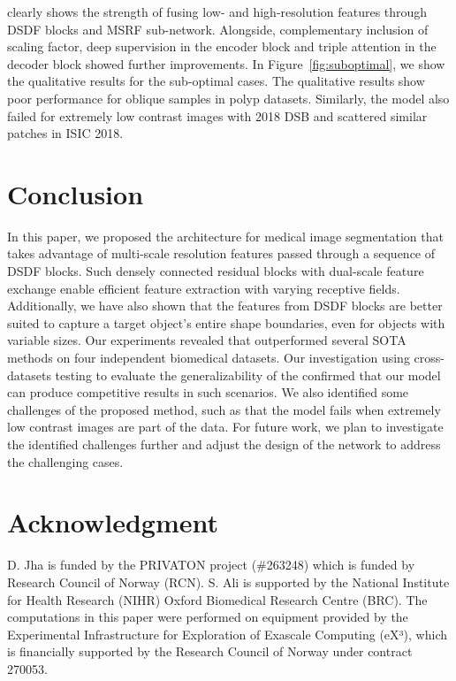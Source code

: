\documentclass[journal,twoside,web]{IEEEtran}
\newcommand{\sysname}{\text{MSRF-Net}\xspace}
\begin{document}
 \sysname clearly shows the strength of fusing low- and high-resolution features through DSDF blocks and MSRF sub-network. Alongside, complementary inclusion of scaling factor, deep supervision in the encoder block and triple attention in the decoder block showed further improvements. In Figure~\ref{fig:suboptimal}, we show the qualitative results for the sub-optimal cases. The qualitative results show poor performance for oblique samples in polyp datasets. Similarly, the model also failed for extremely low contrast images with 2018 DSB and scattered similar patches in ISIC 2018. 

\vspace{-3mm}

\section{Conclusion}

In this paper, we proposed the \sysname architecture for medical image segmentation that takes advantage of multi-scale resolution features passed through a sequence of \ac{DSDF} blocks. Such densely connected residual blocks with dual-scale feature exchange enable efficient feature extraction with varying receptive fields. Additionally, we have also shown that the features from \ac{DSDF} blocks are better suited to capture a target object's entire shape boundaries, even for objects with variable sizes. Our experiments revealed that \sysname outperformed several \ac{SOTA} methods on four independent biomedical datasets. Our investigation using cross-datasets testing to evaluate the generalizability of the \sysname confirmed that our model can produce competitive results in such scenarios. We also identified some challenges of the proposed method, such as that the model fails when extremely low contrast images are part of the data. For future work, we plan to investigate the identified challenges further and adjust the design of the network to address the challenging cases. 

\section*{Acknowledgment}
D. Jha is funded by the PRIVATON project (\#263248) which is funded by Research Council of Norway (RCN). S. Ali is supported by the National Institute for Health Research (NIHR) Oxford Biomedical Research Centre (BRC). The computations in this paper were performed on equipment provided by the Experimental Infrastructure for Exploration of Exascale Computing (eX³), which is financially supported by the Research Council of Norway under contract 270053.

\vspace{-2mm}



\vspace{-2mm}
 
\end{document}
